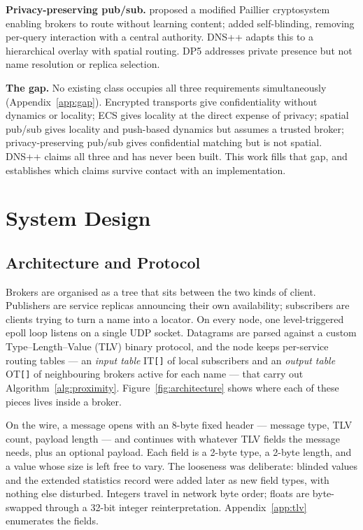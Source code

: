 \documentclass[10pt]{article}
\begin{document}
\textbf{Privacy-preserving pub/sub.} \citet{nabeel2012efficient} proposed a modified Paillier cryptosystem enabling brokers to route without learning content; \citet{nabeel2013privacy} added self-blinding, removing per-query interaction with a central authority. DNS++ adapts this to a hierarchical overlay with spatial routing. DP5 \citep{borisov2015dp5} addresses private presence but not name resolution or replica selection.

\textbf{The gap.} No existing class occupies all three requirements simultaneously (Appendix~\ref{app:gap}). Encrypted transports give confidentiality without dynamics or locality; ECS gives locality at the direct expense of privacy; spatial pub/sub gives locality and push-based dynamics but assumes a trusted broker; privacy-preserving pub/sub gives confidential matching but is not spatial. DNS++ claims all three and has never been built. This work fills that gap, and establishes which claims survive contact with an implementation.

\section{System Design}
\label{sec:design}

\subsection{Architecture and Protocol}

Brokers are organised as a tree that sits between the two kinds of client. Publishers are service replicas announcing their own availability; subscribers are clients trying to turn a name into a locator. On every node, one level-triggered epoll loop listens on a single UDP socket. Datagrams are parsed against a custom Type–Length–Value (TLV) binary protocol, and the node keeps per-service routing tables --- an \emph{input table} IT\texttt{[]} of local subscribers and an \emph{output table} OT\texttt{[]} of neighbouring brokers active for each name --- that carry out Algorithm~\ref{alg:proximity}.
Figure~\ref{fig:architecture} shows where each of these pieces lives inside a broker.

On the wire, a message opens with an 8-byte fixed header --- message type, TLV count, payload length --- and continues with whatever TLV fields the message needs, plus an optional payload. Each field is a 2-byte type, a 2-byte length, and a value whose size is left free to vary. The looseness was deliberate: blinded values and the extended statistics record were added later as new field types, with nothing else disturbed. Integers travel in network byte order; floats are byte-swapped through a 32-bit integer reinterpretation. Appendix~\ref{app:tlv} enumerates the fields.
\end{document}
